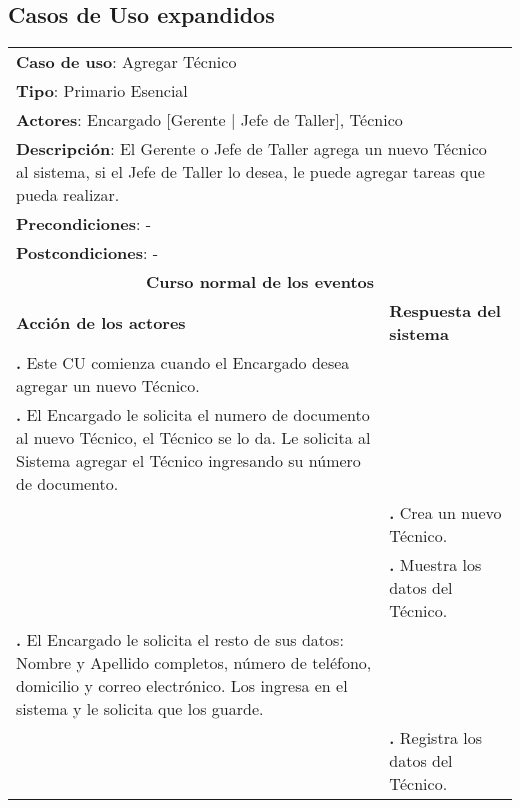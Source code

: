 \documentclass[12pt]{extarticle}
\begin{document}
    \subsection{Casos de Uso expandidos}

    \newcommand\inc{\stepcounter{step}\textbf{\thestep. }}
    \newcommand\resetinc{\setcounter{step}{0}}
    
    \newcommand\raya{\noindent\rule{169mm}{0.8mm}\\}

\begin{longtable}{ |p{8cm}|p{8cm}| }
    \hline
    \multicolumn{2}{|p{16cm}|}{\textbf{Caso de uso}: Agregar Técnico}\\
    \multicolumn{2}{|p{16cm}|}{\textbf{Tipo}: Primario Esencial}\\
    \multicolumn{2}{|p{16cm}|}{\textbf{Actores}: Encargado [Gerente | Jefe de Taller], Técnico}\\
    \multicolumn{2}{|p{16cm}|}{\textbf{Descripción}: El Gerente o Jefe de Taller agrega un nuevo Técnico al sistema, si el Jefe de Taller lo desea, le puede agregar tareas que pueda realizar.}\\
    \multicolumn{2}{|p{16cm}|}{\textbf{Precondiciones}: - }\\
    \multicolumn{2}{|p{16cm}|}{\textbf{Postcondiciones}: - }\\
    \hline
    \multicolumn{2}{|c|}{\textbf{Curso normal de los eventos}}\\
    \hline
    \textbf{Acción de los actores} & \textbf{Respuesta del sistema}\\
    \hline
        \inc Este CU comienza cuando el Encargado desea agregar un nuevo Técnico.& \\
        \hline
        \inc  El Encargado le solicita el numero de documento al nuevo Técnico, el Técnico se lo da. Le solicita al Sistema agregar el Técnico ingresando su número de documento.& \\
        \hline
        & \inc  Crea un nuevo Técnico.\\
        \hline
        & \inc  Muestra los datos del Técnico.\\
        \hline
        \inc El Encargado le solicita el resto de sus datos: Nombre y Apellido completos, número de teléfono, domicilio y correo electrónico. Los ingresa en el sistema y le solicita que los guarde.& \\
        \hline
        & \inc Registra los datos del Técnico.\\

\end{longtable}
\end{document}
